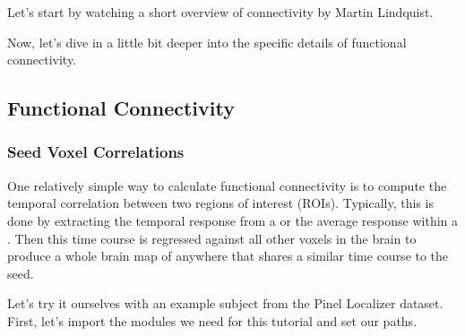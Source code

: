 \documentclass[letterpaper,10pt,english]{sphinxmanual}
\begin{document}
Let’s start by watching a short overview of connectivity by Martin Lindquist.

\begin{sphinxVerbatim}[commandchars=\\\{\}]
   

\end{sphinxVerbatim}

\noindent{}

Now, let’s dive in a little bit deeper into the specific details of functional connectivity.

\begin{sphinxVerbatim}[commandchars=\\\{\}]
\end{sphinxVerbatim}

\noindent{}


\subsection{Functional Connectivity}
\label{\detokenize{content/Connectivity:functional-connectivity}}

\subsubsection{Seed Voxel Correlations}
\label{\detokenize{content/Connectivity:seed-voxel-correlations}}
One relatively simple way to calculate functional connectivity is to compute the temporal correlation between two regions of interest (ROIs). Typically, this is done by extracting the temporal response from a  or the average response within a . Then this time course is regressed against all other voxels in the brain to produce a whole brain map of anywhere that shares a similar time course to the seed.

Let’s try it ourselves with an example subject from the Pinel Localizer dataset. First, let’s import the modules we need for this tutorial and set our paths.
\end{document}
